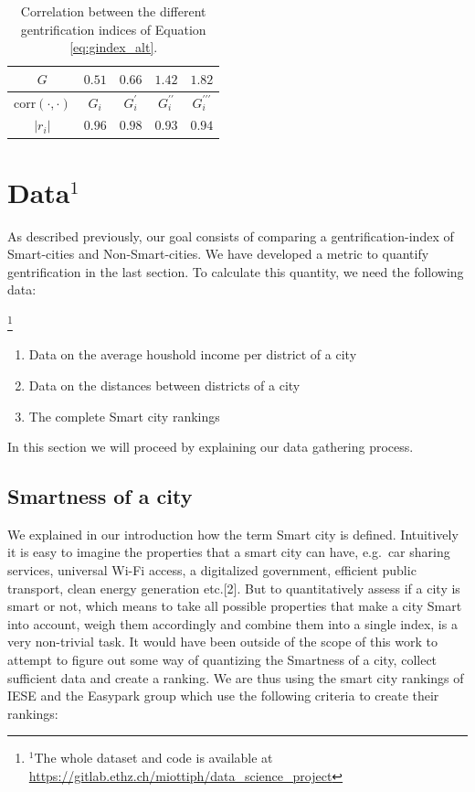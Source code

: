 \documentclass[a4paper, 10pt]{IEEEconf}      %
\providecommand{\tabularnewline}{\\}
\begin{document}
\begin{table}[h]
	\begin{centering}
		\begin{tabular}{|c|c|c|c|c|}
			\hline 
			$G$ & $0.51$ & $0.66$ & $1.42$ & $1.82$\tabularnewline
			\hline 
			\hline 
			$\mathrm{corr}\left(\cdot,\cdot\right)$ & $G_{i}$ & $G_{i}^{\prime}$ & $G_{i}^{\prime\prime}$ & $G_{i}^{\prime\prime\prime}$\tabularnewline
			\hline 
			$\left|r_{i}\right|$ & $0.96$ & $0.98$ & $0.93$ & $0.94$\tabularnewline
			\hline 
		\end{tabular}
		\par\end{centering}
\caption{Correlation between the different gentrification indices of Equation \ref{eq:gindex_alt}.}
\label{tab:Correlation}
\end{table}

\section{Data$^{1}$}
\label{section:Data}
As described previously, our goal consists of comparing a gentrification-index of Smart-cities and Non-Smart-cities. We have developed a metric to quantify gentrification in the last section. To calculate  this quantity, we need the following data:

\thanks{$^{1}$The whole dataset and code is available at \url{https://gitlab.ethz.ch/miottiph/data_science_project}  }

\begin{enumerate}
	\item Data on the average houshold income per district of a city
	\item Data on the distances between districts of a city 
	\item The complete Smart city rankings
\end{enumerate}

In this section we will proceed by explaining our data gathering process. 

\subsection{Smartness of a city}
We explained in our introduction how the term Smart city is defined. Intuitively it is easy to imagine the properties
that a smart city can have, e.g.\ car sharing services, universal Wi-Fi access, a digitalized government, efficient public transport,
clean energy generation etc.[2]. But to quantitatively assess if a city is smart or not, which means to take all possible properties that make a city Smart into account,
weigh them accordingly and combine them into a single index, is a very non-trivial task. It would have been outside of the 
scope of this work to attempt to figure out some way of quantizing the Smartness of a city, collect sufficient data and create a ranking.
We are thus using the smart city rankings of IESE \cite{c1} and the Easypark group \cite{c2} which use the following criteria to create their rankings:
\newline
\end{document}
